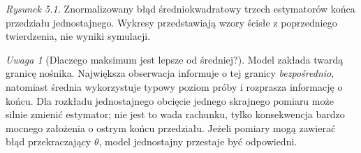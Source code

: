 \documentclass[11pt,a4paper,oneside]{report}
\numberwithin{equation}{chapter}
\theoremstyle{plain}
\theoremstyle{definition}
\theoremstyle{remark}
\newtheorem{uwaga}{Uwaga}[chapter]
\begin{document}
\begin{center}
\end{center}
\noindent\emph{Rysunek 5.1.} Znormalizowany błąd średniokwadratowy
trzech estymatorów końca przedziału jednostajnego. Wykresy
przedstawiają wzory ścisłe z poprzedniego twierdzenia,
nie wyniki symulacji.

\begin{uwaga}[Dlaczego maksimum jest lepsze od średniej?]
Model zakłada twardą granicę nośnika. Największa obserwacja
informuje o tej granicy \emph{bezpośrednio}, natomiast średnia
wykorzystuje typowy poziom próby i rozprasza informację o końcu.
Dla rozkładu jednostajnego obcięcie jednego skrajnego pomiaru
może silnie zmienić estymator; nie jest to wada rachunku, tylko
konsekwencja bardzo mocnego założenia o ostrym końcu przedziału.
Jeżeli pomiary mogą zawierać błąd przekraczający $\theta$,
model jednostajny przestaje być odpowiedni.
\end{uwaga}
\end{document}
